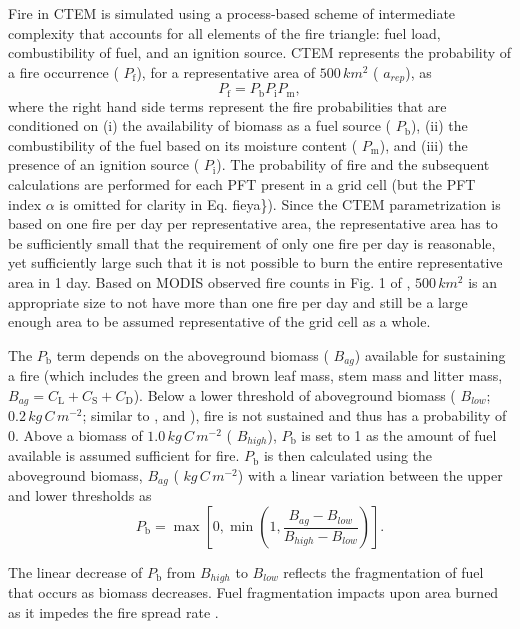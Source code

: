Fire in C\+T\+E\+M is simulated using a process-\/based scheme of intermediate complexity that accounts for all elements of the fire triangle\+: fuel load, combustibility of fuel, and an ignition source. C\+T\+E\+M represents the probability of a fire occurrence ( $P_\mathrm{f}$), for a representative area of $500\,km^2$ ( $a_{rep}$), as \[ \label{fieya} P_\mathrm{f} = P_\mathrm{b}P_\mathrm{i}P_\mathrm{m},\] where the right hand side terms represent the fire probabilities that are conditioned on (i) the availability of biomass as a fuel source ( $P_\mathrm{b}$), (ii) the combustibility of the fuel based on its moisture content ( $P_\mathrm{m}$), and (iii) the presence of an ignition source ( $P_\mathrm{i}$). The probability of fire and the subsequent calculations are performed for each P\+F\+T present in a grid cell (but the P\+F\+T index $\alpha$ is omitted for clarity in Eq. fieya\}). Since the C\+T\+E\+M parametrization is based on one fire per day per representative area, the representative area has to be sufficiently small that the requirement of only one fire per day is reasonable, yet sufficiently large such that it is not possible to burn the entire representative area in 1 day. Based on M\+O\+D\+I\+S observed fire counts in Fig. 1 of \cite{Li20121c2}, $500\,km^2$ is an appropriate size to not have more than one fire per day and still be a large enough area to be assumed representative of the grid cell as a whole.

The $P_\mathrm{b}$ term depends on the aboveground biomass ( $B_{ag}$) available for sustaining a fire (which includes the green and brown leaf mass, stem mass and litter mass, $B_{ag} = C_\mathrm{L} + C_\mathrm{S} + C_\mathrm{D}$). Below a lower threshold of aboveground biomass ( $B_{low}$; $0.2\, kg\,C\,m^{-2}$; similar to \cite{Moorcroft2001-co}, and \cite{Kucharik2000-xk}), fire is not sustained and thus has a probability of 0. Above a biomass of $1.0\, kg\,C\,m^{-2}$ ( $B_{high}$), $P_\mathrm{b}$ is set to 1 as the amount of fuel available is assumed sufficient for fire. $P_\mathrm{b}$ is then calculated using the aboveground biomass, $B_{ag}$ ( $kg\,C\,m^{-2}$) with a linear variation between the upper and lower thresholds as \[ \label{eqn:Pb} P_\mathrm{b}=\max\left[0, \min\left(1,\frac{B_{ag}-B_{low}} {B_{high} - B_{low}}\right)\right]. \]

The linear decrease of $P_\mathrm{b}$ from $B_{high}$ to $B_{low}$ reflects the fragmentation of fuel that occurs as biomass decreases. Fuel fragmentation impacts upon area burned as it impedes the fire spread rate \cite{Guyette2002-rc}.

